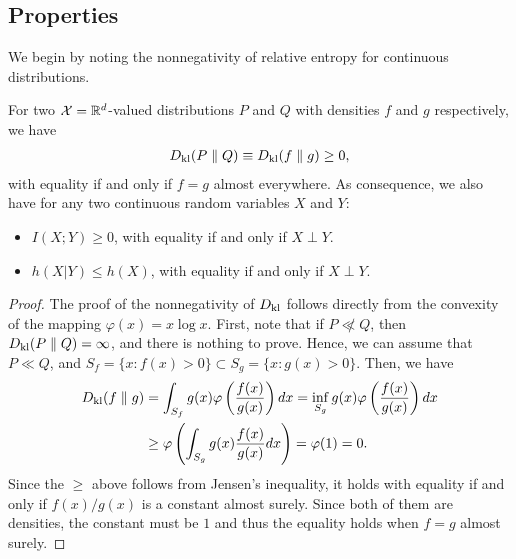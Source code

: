         \subsection{Properties}
        \label{subsec:continuous-properties}
            We begin by noting the nonnegativity of relative entropy for continuous distributions. 
            \begin{proposition}
                \label{prop:continuous-property-1} 
                For two $\mathcal{X}=\mathbb{R}^d$-valued distributions $P$ and $Q$ with densities $f$ and $g$ respectively, we have 
                \begin{align}
                    D_{\text{kl}}(P \parallel Q) \equiv D_{\text{kl}}(f \parallel g) \geq 0, 
                \end{align}
                with equality if and only if $f=g$ almost everywhere. As consequence, we also have for any two continuous random variables $X$ and $Y$: 
                \begin{itemize}
                    \item $I(X; Y) \geq 0$, with equality if and only if $X \perp Y$. 
                    \item $h(X|Y) \leq h(X)$, with equality if and only if $X \perp Y$. 
                \end{itemize}
            \end{proposition}
            \begin{proof}
                The proof of the nonnegativity of $D_{\text{kl}}$ follows directly from the convexity of the mapping $\varphi(x) = x\log x$. First, note that if $P \not \ll Q$, then $D_{\text{kl}}(P\parallel Q) = \infty$, and there is nothing to prove. Hence, we can assume that $P \ll Q$, and $S_f = \{x:f(x)>0\} \subset S_g = \{x: g(x) > 0\}$. 
                Then, we have 
                \begin{align}
                    D_{\text{kl}}(f \parallel g) &= \int_{S_f} g(x) \varphi\left( \frac{f(x)}{g(x)} \right) dx  = \inf_{S_g} g(x) \varphi\left( \frac{f(x)}{g(x)} \right) dx   \\
                    & \geq \varphi \left( \int_{S_g} g(x) \frac{f(x)}{g(x)}dx \right) = \varphi(1) = 0. 
                \end{align}
                Since the $\geq$ above follows from Jensen's inequality, it holds with equality if and only if $f(x)/g(x)$ is a constant almost surely. Since both of them are densities, the constant must be $1$ and thus the equality holds when $f=g$ almost surely. 
            \end{proof}

